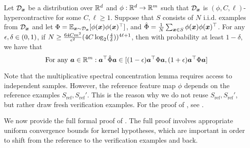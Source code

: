 \documentclass[11pt]{article} %
\numberwithin{equation}{section}
\begin{document}
\begin{lemma}\label{lemma:relative-error-kernel-matrix}
    Let ${\mathcal{D}}_{{\bm{x}}}$ be a distribution over $\mathbb{R}^d$ and $\phi:\mathbb{R}^d \to \mathbb{R}^m$ such that ${\mathcal{D}}_{{\bm{x}}}$ is $(\phi,C,\ell)$-hypercontractive for some $C,\ell \ge 1$. Suppose that $S$ consists of $N$ i.i.d. examples from ${\mathcal{D}}_{{\bm{x}}}$ and let $\Phi = \mathbb{E}_{{\bm{x}}\sim{\mathcal{D}}_{{\bm{x}}}}[\phi({\bm{x}})\phi({\bm{x}})^\top]$, and $\hat\Phi = \frac{1}{N}\sum_{{\bm{x}}\in S}\phi({\bm{x}})\phi({\bm{x}})^\top$. For any ${\epsilon},\delta\in(0,1)$, if $N\ge \frac{64 Cm^2}{{\epsilon}^2}(4C \log_2(\frac{4}{\delta}))^{4\ell+1}$, then with probability at least $1-\delta$, we have that
    \[
        \text{For any }{\bm{a}}\in\mathbb{R}^m: {\bm{a}}^\top \hat\Phi {\bm{a}} \in [{(1-{\epsilon})} {\bm{a}}^\top \Phi{\bm{a}}, (1+{\epsilon}){\bm{a}}^\top \Phi{\bm{a}}]
    \]
\end{lemma}
Note that the multiplicative spectral concentration lemma requires access to independent samples. However, the reference feature map $\phi$ depends on the reference examples $S_{\mathrm{ref}}, S_{\mathrm{ref}}'$. This is the reason why we do not reuse $S_{\mathrm{ref}}, S_{\mathrm{ref}}'$, but rather draw fresh verification examples. For the proof of , see .

We now provide the full formal proof of . The full proof involves appropriate uniform convergence bounds for kernel hypotheses, which are important in order to shift from the reference to the verification examples and back. %

\end{document}
